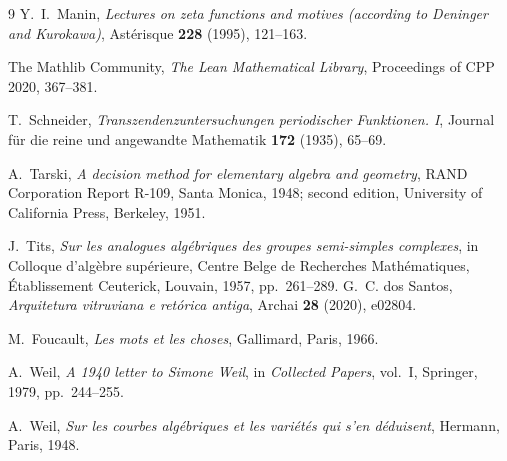 \documentclass[11pt]{amsart}
\theoremstyle{definition}
\begin{document}
\begin{thebibliography}{9}
Y.~I.~Manin,
\textit{Lectures on zeta functions and motives (according to Deninger
and Kurokawa)},
Astérisque \textbf{228} (1995), 121--163.

The Mathlib Community,
\textit{The Lean Mathematical Library},
Proceedings of CPP 2020, 367--381.

T.~Schneider,
\textit{Transzendenzuntersuchungen periodischer Funktionen. I},
Journal für die reine und angewandte Mathematik \textbf{172} (1935), 65--69.

A.~Tarski,
\textit{A decision method for elementary algebra and geometry},
RAND Corporation Report R-109, Santa Monica, 1948; second edition,
University of California Press, Berkeley, 1951.

J.~Tits,
\textit{Sur les analogues algébriques des groupes semi-simples
complexes},
in Colloque d'algèbre supérieure, Centre Belge de Recherches
Mathématiques, Établissement Ceuterick, Louvain, 1957, pp.~261--289.
G.~C. dos Santos,
\textit{Arquitetura vitruviana e ret\'orica antiga},
Archai \textbf{28} (2020), e02804.

M.~Foucault,
\textit{Les mots et les choses},
Gallimard, Paris, 1966.

A.~Weil,
\textit{A 1940 letter to Simone Weil}, in
\textit{Collected Papers}, vol.~I, Springer, 1979, pp.~244--255.

A.~Weil,
\textit{Sur les courbes alg\'ebriques et les vari\'et\'es qui s'en
d\'eduisent}, Hermann, Paris, 1948.

\end{thebibliography}
\end{document}
